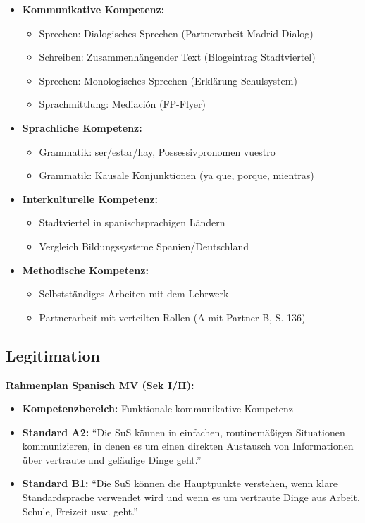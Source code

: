 \documentclass[11pt,a4paper]{article}
\begin{document}
\begin{itemize}
    \item \textbf{Kommunikative Kompetenz:}
    \begin{itemize}
        \item [A] Sprechen: Dialogisches Sprechen (Partnerarbeit Madrid-Dialog)
        \item [A] Schreiben: Zusammenhängender Text (Blogeintrag Stadtviertel)
        \item [B] Sprechen: Monologisches Sprechen (Erklärung Schulsystem)
        \item [B] Sprachmittlung: Mediación (FP-Flyer)
    \end{itemize}
    \item \textbf{Sprachliche Kompetenz:}
    \begin{itemize}
        \item [A] Grammatik: ser/estar/hay, Possessivpronomen vuestro
        \item [B] Grammatik: Kausale Konjunktionen (ya que, porque, mientras)
    \end{itemize}
    \item \textbf{Interkulturelle Kompetenz:}
    \begin{itemize}
        \item [A] Stadtviertel in spanischsprachigen Ländern
        \item [B] Vergleich Bildungssysteme Spanien/Deutschland
    \end{itemize}
    \item \textbf{Methodische Kompetenz:}
    \begin{itemize}
        \item Selbstständiges Arbeiten mit dem Lehrwerk
        \item Partnerarbeit mit verteilten Rollen (A mit Partner B, S. 136)
    \end{itemize}
\end{itemize}

\subsection{Legitimation}
\textbf{Rahmenplan Spanisch MV (Sek I/II):}
\begin{itemize}
    \item \textbf{Kompetenzbereich:} Funktionale kommunikative Kompetenz
    \item \textbf{Standard A2:} ``Die SuS können in einfachen, routinemäßigen Situationen kommunizieren, in denen es um einen direkten Austausch von Informationen über vertraute und geläufige Dinge geht.''
    \item \textbf{Standard B1:} ``Die SuS können die Hauptpunkte verstehen, wenn klare Standardsprache verwendet wird und wenn es um vertraute Dinge aus Arbeit, Schule, Freizeit usw. geht.''
\end{itemize}
\end{document}
